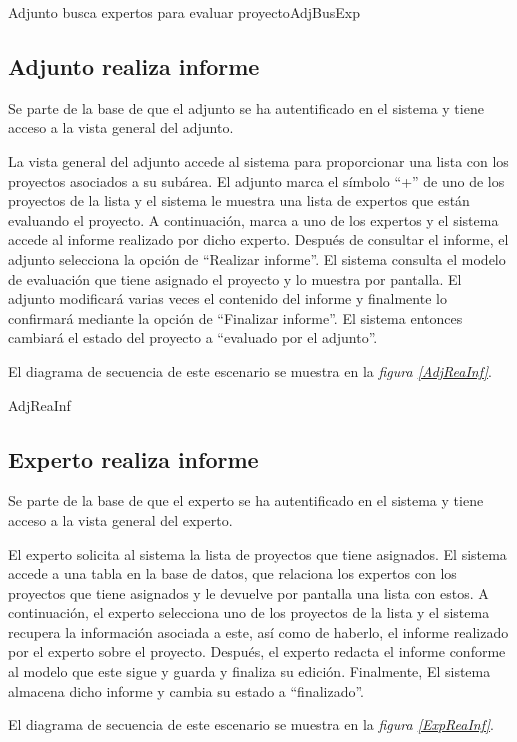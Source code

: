 \documentclass[11pt,a4paper,spanish,twoside]{book}
\begin{document}
{Adjunto busca expertos para evaluar proyecto}{AdjBusExp}

\subsection{Adjunto realiza informe}
Se parte de la base de que el adjunto se ha autentificado en el sistema y
tiene acceso a la vista general del adjunto.

La vista general del adjunto accede al sistema para proporcionar una lista
con los proyectos asociados a su subárea. El adjunto marca el símbolo ``+''
de uno de los proyectos de la lista y el sistema le muestra una lista de 
expertos que están evaluando el proyecto. A continuación, marca a uno de los
expertos y el sistema accede al informe realizado por dicho experto. Después
de consultar el informe, el adjunto selecciona la opción de ``Realizar
informe''. El sistema consulta el modelo de evaluación que tiene asignado el
proyecto y lo muestra por pantalla. El adjunto modificará varias veces
el contenido del informe y finalmente lo confirmará mediante la opción de
``Finalizar informe''. El sistema entonces cambiará el estado del proyecto a
``evaluado por el adjunto''.

El diagrama de secuencia de este escenario se muestra en la \emph{figura
\ref{AdjReaInf}}.

{AdjReaInf}

\subsection{Experto realiza informe}
Se parte de la base de que el experto se ha autentificado en el sistema y
tiene acceso a la vista general del experto.

El experto solicita al sistema la lista de proyectos que tiene asignados. El
sistema accede a una tabla en la base de datos, que relaciona los expertos con
los proyectos que tiene asignados y le devuelve por pantalla una lista con 
estos. A continuación, el experto selecciona uno de los proyectos de la lista
y el sistema recupera la información asociada a este, así como de haberlo, el
informe realizado por el experto sobre el proyecto. Después, el experto
redacta el informe conforme al modelo que este sigue y guarda y finaliza su
edición. Finalmente, El sistema almacena dicho informe y cambia su estado a
``finalizado''.

El diagrama de secuencia de este escenario se muestra en la \emph{figura
\ref{ExpReaInf}}.
\end{document}
